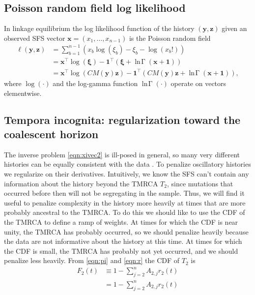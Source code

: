 \documentclass[11pt]{article}
\DeclareMathOperator{\lngamma}{\ln\!\Gamma}
\begin{document}
\subsection{Poisson random field log likelihood}\label{sec:model:ell}


In linkage equilibrium the log likelihood function of the history $(\boldsymbol y, \boldsymbol z)$ given an observed SFS vector $\boldsymbol x = (x_1,\dots,x_{n-1})$ is the Poisson random field \citep{}
\begin{align}
\ell(\boldsymbol y, \boldsymbol z) &= \sum_{b=1}^{n-1}\left(x_b\log(\xi_b) - \xi_b - \log(x_b!)\right)\\
&= \boldsymbol x^\intercal\log(\boldsymbol\xi) - \boldsymbol 1^\intercal\left(\boldsymbol\xi + \lngamma(\boldsymbol x + \boldsymbol 1)\right)\\
&= \boldsymbol x^\intercal\log(C M(\boldsymbol y) \boldsymbol z) - \boldsymbol 1^\intercal\left(C M(\boldsymbol y) \boldsymbol z + \lngamma(\boldsymbol x + \boldsymbol 1)\right),
\end{align}
where $\log(\cdot)$ and the log-gamma function $\lngamma(\cdot)$ operate on vectors elementwise.

\subsection{Tempora incognita: regularization toward the coalescent horizon}\label{sec:model:loss}

The inverse problem \eqref{eqn:xivec2} is ill-posed in general, so many very different histories can be equally consistent with the data \citep{oscillation paper? Yun's other papers?}.
To penalize oscillatory histories we regularize on their derivatives.
Intuitively, we know the SFS can't contain any information about the history beyond the TMRCA $T_2$, since mutations that occurred before then will not be segregating in the sample.
Thus, we will find it useful to penalize complexity in the history more heavily at times that are more probably ancestral to the TMRCA.
To do this we should like to use the CDF of the TMRCA to define a ramp of weights.
At times for which the CDF is near unity, the TMRCA has probably occurred, so we should penalize heavily because the data are not informative about the history at this time.
At times for which the CDF is small, the TMRCA has probably not yet occurred, and we should penalize less heavily.
From \eqref{eqn:pi} and \eqref{eqn:r} the CDF of $T_2$ is
\begin{align}
F_2(t) &\equiv 1 - \sum_{j=2}^n A_{2,j}r_2(t)\\
&= 1 - \sum_{j=2}^n A_{2,j}r_2(t)
\end{align}
\end{document}
